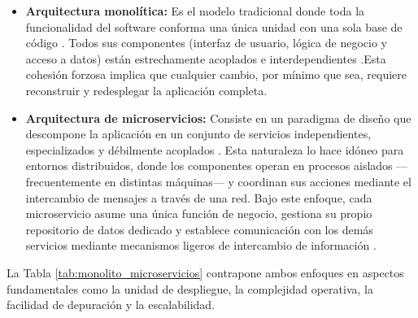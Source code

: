 \begin{itemize}
    \item \textbf{Arquitectura monolítica:} Es el modelo tradicional donde toda la funcionalidad del software conforma una única unidad con una sola base de código \cite{ibm_microservices_monolith}. Todos sus componentes (interfaz de usuario, lógica de negocio y acceso a datos) están estrechamente acoplados e interdependientes \cite{aws_monolith_microservices}.Esta cohesión forzosa implica que cualquier cambio, por mínimo que sea, requiere reconstruir y redesplegar la aplicación completa.
   
    \item \textbf{Arquitectura de microservicios:} Consiste en un paradigma de diseño que descompone la aplicación en un conjunto de servicios independientes, especializados y débilmente acoplados \cite{ibm_microservices_advantages}. 
    Esta naturaleza lo hace idóneo para entornos distribuidos, donde los componentes operan en procesos aislados —frecuentemente en distintas máquinas— y coordinan sus acciones mediante el intercambio de mensajes a través de una red.
    Bajo este enfoque, cada microservicio asume una única función de negocio, gestiona su propio repositorio de datos dedicado y establece comunicación con los demás servicios mediante mecanismos ligeros de intercambio de información \cite{aws_monolith_microservices,ibm_microservices_advantages}.

\end{itemize}

La Tabla \ref{tab:monolito_microservicios} contrapone ambos enfoques en aspectos fundamentales como la unidad de despliegue, la complejidad operativa, la facilidad de depuración y la escalabilidad. 

